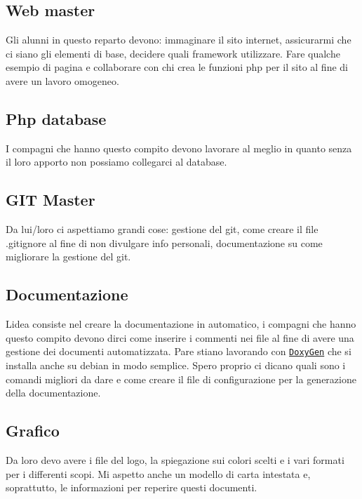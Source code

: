 \subsection*{Web master}

Gli alunni in questo reparto devono\+: immaginare il sito internet, assicurarmi che ci siano gli elementi di base, decidere quali framework utilizzare. Fare qualche esempio di pagina e collaborare con chi crea le funzioni php per il sito al fine di avere un lavoro omogeneo.

\subsection*{Php database}

I compagni che hanno questo compito devono lavorare al meglio in quanto senza il loro apporto non possiamo collegarci al database.

\subsection*{G\+IT Master}

Da lui/loro ci aspettiamo grandi cose\+: gestione del git, come creare il file .gitignore al fine di non divulgare info personali, documentazione su come migliorare la gestione del git.

\subsection*{Documentazione}

L\textquotesingle{}idea consiste nel creare la documentazione in automatico, i compagni che hanno questo compito devono dirci come inserire i commenti nei file al fine di avere una gestione dei documenti automatizzata. Pare stiano lavorando con \href{http://doxygen.nl/}{\tt Doxy\+Gen} che si installa anche su debian in modo semplice. Spero proprio ci dicano quali sono i comandi migliori da dare e come creare il file di configurazione per la generazione della documentazione.

\subsection*{Grafico}

Da loro devo avere i file del logo, la spiegazione sui colori scelti e i vari formati per i differenti scopi. Mi aspetto anche un modello di carta intestata e, soprattutto, le informazioni per reperire questi documenti.

